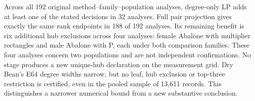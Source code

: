 Across all 192 original method--family--population analyses, degree-only LP adds at least one of the stated decisions in 32 analyses. Full pair projection gives exactly the same rank endpoints in 188 of 192 analyses. Its remaining benefit is six additional hub exclusions across four analyses: female Abalone with multiplier rectangles and male Abalone with P, each under both comparison families. These four analyses concern two populations and are not independent confirmations. No stage produces a new unique-hub declaration on the measurement grid. Dry Bean's E64 degree widths narrow, but no leaf, hub exclusion or top-three restriction is certified, even in the pooled sample of 13,611 records. This distinguishes a narrower numerical bound from a new substantive conclusion.
